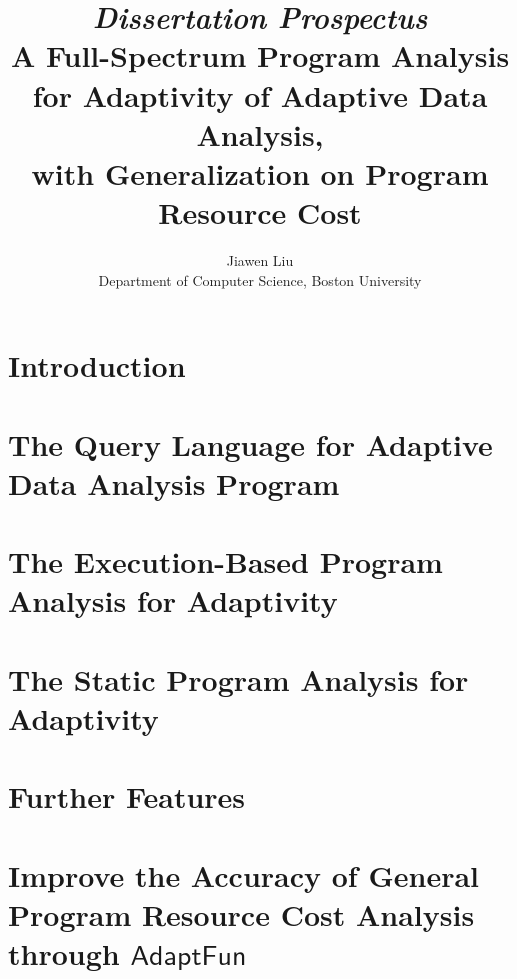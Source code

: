 \documentclass[a4paper,11pt]{article}
\newcommand{\THESYSTEM}{\textsf{AdaptFun}}
\begin{document}
\title{{\em Dissertation Prospectus}
\\  A Full-Spectrum Program Analysis for Adaptivity of Adaptive Data Analysis, 
\\ with Generalization on Program Resource Cost}

\author{Jiawen Liu\\ Department of Computer Science, Boston University}
\maketitle
\begin{abstract}

\end{abstract}
\tableofcontents{}

\section{Introduction}
\label{sec:introduction}


\section{The Query Language for Adaptive Data Analysis Program}
\label{sec:language}


\section{The Execution-Based Program Analysis for Adaptivity}
\label{sec:dynamic}


\section{The Static Program Analysis for Adaptivity}
\label{sec:static}



\section{Further Features}
\label{sec:furthers}


\section{Improve the Accuracy of General Program Resource Cost Analysis through $\THESYSTEM$}
\label{sec:generalization}

\end{document}
